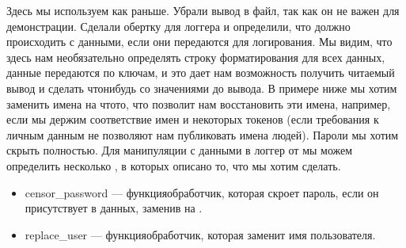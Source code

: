 \documentclass[letterpaper,10pt,russian]{sphinxmanual}
\begin{document}
\begin{sphinxVerbatim}[commandchars=\\\{\}]
  
    \PYG{p}{[}
         
    \PYG{p}{]}
 
 
\end{sphinxVerbatim}

\sphinxAtStartPar
Здесь мы используем  как раньше. Убрали вывод в файл, так как он не важен для демонстрации. Сделали обертку для логгера и определили, что должно происходить с данными, если они передаются для логирования. Мы видим, что здесь нам необязательно определять строку форматирования для всех данных, данные передаются по ключам, и это дает нам возможность получить читаемый вывод и сделать что\sphinxhyphen{}нибудь со значениями до вывода. В примере ниже мы хотим заменить имена на что\sphinxhyphen{}то, что позволит нам восстановить эти имена, например, если мы держим соответствие имен и некоторых токенов (если требования к личным данным не позволяют нам публиковать имена людей). Пароли мы хотим скрыть полностью. Для манипуляции с данными в логгер от  мы можем определить несколько , в которых описано то, что мы хотим сделать.
\begin{itemize}
\item {} 
\sphinxAtStartPar
censor\_password — функция\sphinxhyphen{}обработчик, которая скроет пароль, если он присутствует в данных, заменив на .

\item {} 
\sphinxAtStartPar
replace\_user — функция\sphinxhyphen{}обработчик, которая заменит имя пользователя.

\end{itemize}
\end{document}
